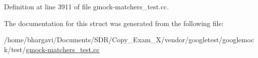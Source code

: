 Definition at line 3911 of file gmock-\/matchers\+\_\+test.\+cc.



The documentation for this struct was generated from the following file\+:\begin{DoxyCompactItemize}
\item 
/home/bhargavi/\+Documents/\+S\+D\+R/\+Copy\+\_\+\+Exam\+\_\+X/vendor/googletest/googlemock/test/\hyperlink{gmock-matchers__test_8cc}{gmock-\/matchers\+\_\+test.\+cc}\end{DoxyCompactItemize}
